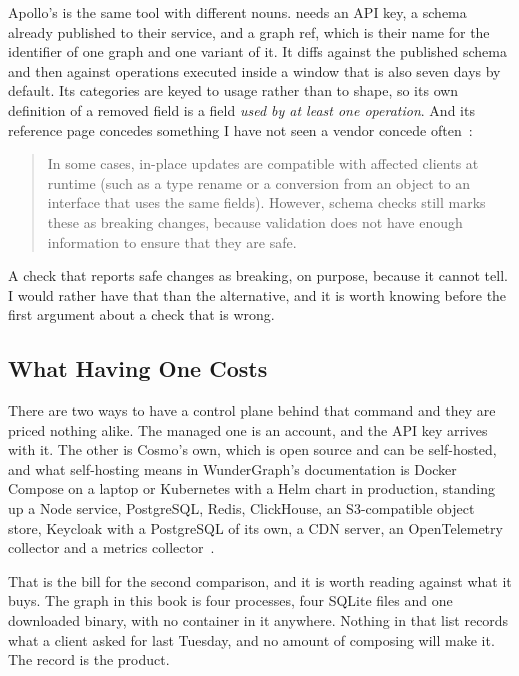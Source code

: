 %
Apollo's is the same tool with different nouns. 
needs an API key, a schema already published to their service, and a graph
ref, which is their name for the identifier of one graph and one variant of
it. It diffs against the published schema and then against operations executed
inside a window that is also seven days by default. Its categories are keyed to usage rather than to
shape, so its own definition of a removed field is a field \emph{used by at
least one operation}. And its reference page concedes something I have not
seen a vendor concede often~\autocite{apollochecksref}:

\begin{quote}
In some cases, in-place updates are compatible with affected clients at runtime
(such as a type rename or a conversion from an object to an interface that uses
the same fields). However, schema checks still marks these as breaking changes,
because validation does not have enough information to ensure that they are
safe.
\end{quote}

%
A check that reports safe changes as breaking, on purpose, because it cannot
tell. I would rather have that than the alternative, and it is worth knowing
before the first argument about a check that is wrong.

\subsection{What Having One Costs}

%
There are two ways to have a control plane behind that command and they are
priced nothing alike. The managed one is an account, and the API key arrives
with it. The other is Cosmo's own, which is open source and can be self-hosted,
and what self-hosting means in WunderGraph's documentation is Docker Compose on
a laptop or Kubernetes with a Helm chart in production, standing up a Node
service, PostgreSQL, Redis, ClickHouse, an S3-compatible object store, Keycloak
with a PostgreSQL of its own, a CDN server, an OpenTelemetry collector and a
metrics collector~\autocite{cosmoselfhosted}.

%
That is the bill for the second comparison, and it is worth reading against
what it buys. The graph in this book is four processes, four SQLite files and
one downloaded binary, with no container in it anywhere. Nothing in that list
records what a client asked for last Tuesday, and no amount of composing will
make it. The record is the product.

